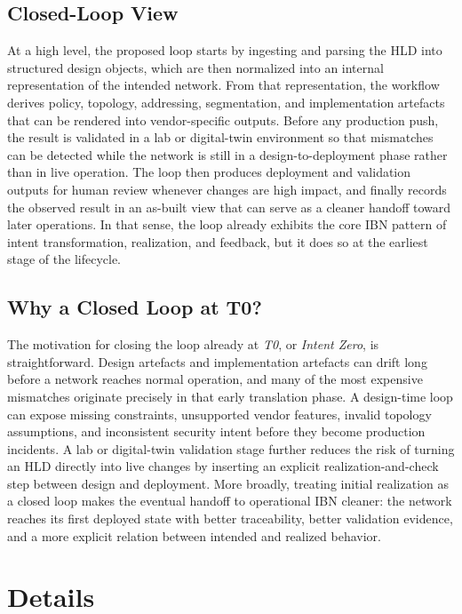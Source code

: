 \documentclass[conference]{IEEEtran}
\begin{document}
\subsection{Closed-Loop View}

At a high level, the proposed loop starts by ingesting and parsing the HLD into structured design objects, which are then normalized into an internal representation of the intended network. From that representation, the workflow derives policy, topology, addressing, segmentation, and implementation artefacts that can be rendered into vendor-specific outputs. Before any production push, the result is validated in a lab or digital-twin environment so that mismatches can be detected while the network is still in a design-to-deployment phase rather than in live operation. The loop then produces deployment and validation outputs for human review whenever changes are high impact, and finally records the observed result in an as-built view that can serve as a cleaner handoff toward later operations. In that sense, the loop already exhibits the core IBN pattern of intent transformation, realization, and feedback, but it does so at the earliest stage of the lifecycle.

\subsection{Why a Closed Loop at T0?}

The motivation for closing the loop already at \emph{T0}, or \emph{Intent Zero}, is straightforward. Design artefacts and implementation artefacts can drift long before a network reaches normal operation, and many of the most expensive mismatches originate precisely in that early translation phase. A design-time loop can expose missing constraints, unsupported vendor features, invalid topology assumptions, and inconsistent security intent before they become production incidents. A lab or digital-twin validation stage further reduces the risk of turning an HLD directly into live changes by inserting an explicit realization-and-check step between design and deployment. More broadly, treating initial realization as a closed loop makes the eventual handoff to operational IBN cleaner: the network reaches its first deployed state with better traceability, better validation evidence, and a more explicit relation between intended and realized behavior.

\section{Details}
\end{document}
